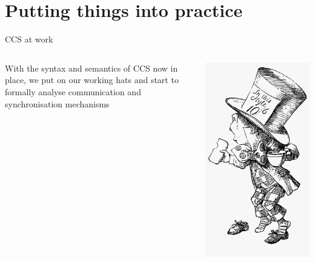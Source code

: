 \documentclass{beamer}
\begin{document}
\section{Putting things into practice}

\begin{frame}{CCS at work}
  \begin{minipage}[0.3\textheight]{\textwidth}
  \begin{columns}[c]
  \begin{column}{0.62\textwidth}
    With the syntax and semantics of CCS now in place, we put on
    our working hats and start to \alert{formally} analyse
    communication and synchronisation mechanisms
  \end{column}
  \begin{column}{0.28\textwidth}
    \includegraphics[scale=0.1]{images/mad-hatter.png}
  \end{column}
  \end{columns}
  \end{minipage}
\end{frame}
\end{document}
